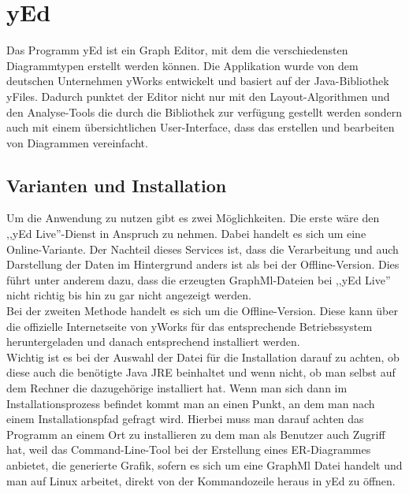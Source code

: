 \section{yEd}
\label{yed}
\prc

Das Programm yEd ist ein Graph Editor, mit dem die verschiedensten Diagrammtypen erstellt werden können. Die Applikation wurde von dem deutschen Unternehmen yWorks entwickelt und basiert auf der Java-Bibliothek yFiles. Dadurch punktet der Editor nicht nur mit den Layout-Algorithmen und den Analyse-Tools die durch die Bibliothek zur verfügung gestellt werden sondern auch mit einem übersichtlichen User-Interface, dass das erstellen und bearbeiten von Diagrammen vereinfacht.
\\

\subsection{Varianten und Installation}

\noindent
Um die Anwendung zu nutzen gibt es zwei Möglichkeiten. Die erste wäre den ,,yEd Live''-Dienst in Anspruch zu nehmen. Dabei handelt es sich um eine Online-Variante. Der Nachteil dieses Services ist, dass die Verarbeitung und auch Darstellung der Daten im Hintergrund anders ist als bei der Offline-Version. Dies führt unter anderem dazu, dass die erzeugten GraphMl-Dateien bei ,,yEd Live'' nicht richtig bis hin zu gar nicht angezeigt werden.
\\

\noindent
Bei der zweiten Methode handelt es sich um die Offline-Version. Diese kann über die offizielle Internetseite von yWorks für das entsprechende Betriebssystem heruntergeladen und danach entsprechend installiert werden.
\\

\noindent
Wichtig ist es bei der Auswahl der Datei für die Installation darauf zu achten, ob diese auch die benötigte Java JRE beinhaltet und wenn nicht, ob man selbst auf dem Rechner die dazugehörige installiert hat. Wenn man sich dann im Installationsprozess befindet kommt man an einen Punkt, an dem man nach einem Installationspfad gefragt wird. Hierbei muss man darauf achten das Programm an einem Ort zu installieren zu dem man als Benutzer auch Zugriff hat, weil das Command-Line-Tool bei der Erstellung eines ER-Diagrammes anbietet, die generierte Grafik, sofern es sich um eine GraphMl Datei handelt und man auf Linux arbeitet, direkt von der Kommandozeile heraus in yEd zu öffnen.

